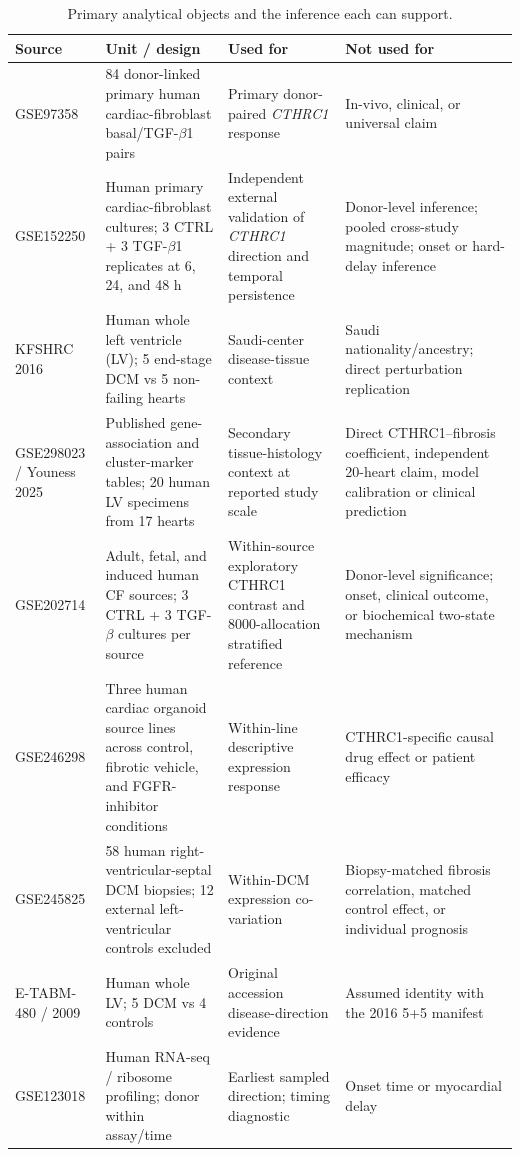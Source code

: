 \documentclass[preprint,11pt]{elsarticle}
\newcommand{\cthrc}{\textit{CTHRC1}}
\newcommand{\tgfb}{TGF-$\beta$1}
\begin{document}
\begin{table}[H]
\centering
\caption{Primary analytical objects and the inference each can support.}
\label{tab:data}
\scriptsize
\begin{tabularx}{\linewidth}{p{2.0cm}p{2.6cm}YY}
\toprule
\textbf{Source} & \textbf{Unit / design} & \textbf{Used for} & \textbf{Not used for}\\
\midrule
GSE97358 & 84 donor-linked primary human cardiac-fibroblast basal/\tgfb{} pairs & Primary donor-paired \cthrc{} response & In-vivo, clinical, or universal claim\\
GSE152250 & Human primary cardiac-fibroblast cultures; 3 CTRL + 3 \tgfb{} replicates at 6, 24, and 48 h & Independent external validation of \cthrc{} direction and temporal persistence & Donor-level inference; pooled cross-study magnitude; onset or hard-delay inference\\
KFSHRC 2016 & Human whole left ventricle (LV); 5 end-stage DCM vs 5 non-failing hearts & Saudi-center disease-tissue context & Saudi nationality/ancestry; direct perturbation replication\\
GSE298023 / Youness 2025 & Published gene-association and cluster-marker tables; 20 human LV specimens from 17 hearts & Secondary tissue-histology context at reported study scale & Direct CTHRC1--fibrosis coefficient, independent 20-heart claim, model calibration or clinical prediction\\
GSE202714 & Adult, fetal, and induced human CF sources; 3 CTRL + 3 TGF-$\beta$ cultures per source & Within-source exploratory CTHRC1 contrast and 8000-allocation stratified reference & Donor-level significance; onset, clinical outcome, or biochemical two-state mechanism\\
GSE246298 & Three human cardiac organoid source lines across control, fibrotic vehicle, and FGFR-inhibitor conditions & Within-line descriptive expression response & CTHRC1-specific causal drug effect or patient efficacy\\
GSE245825 & 58 human right-ventricular-septal DCM biopsies; 12 external left-ventricular controls excluded & Within-DCM expression co-variation & Biopsy-matched fibrosis correlation, matched control effect, or individual prognosis\\
E-TABM-480 / 2009 & Human whole LV; 5 DCM vs 4 controls & Original accession disease-direction evidence & Assumed identity with the 2016 5+5 manifest\\
GSE123018 & Human RNA-seq / ribosome profiling; donor within assay/time & Earliest sampled direction; timing diagnostic & Onset time or myocardial delay\\

\end{tabularx}
\end{table}
\end{document}
